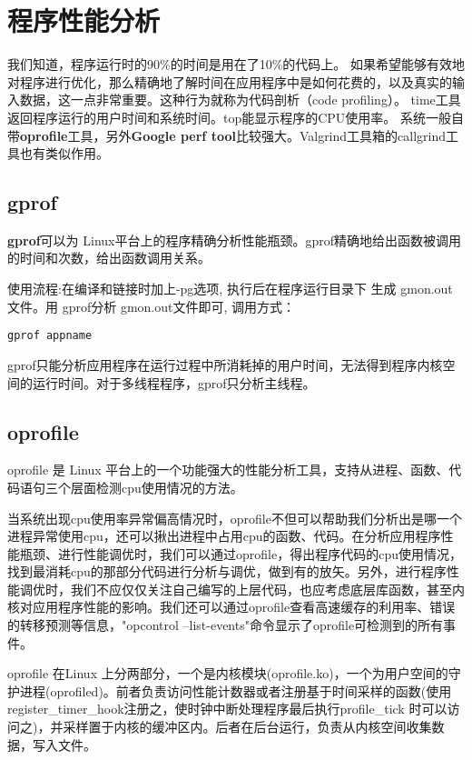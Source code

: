 \section{程序性能分析}
我们知道，程序运行时的90\%的时间是用在了10\%的代码上。
如果希望能够有效地对程序进行优化，那么精确地了解时间在应用程序中是如何花费的，以及真实的输入数据，这一点非常重要。这种行为就称为代码剖析（code profiling）。
time工具返回程序运行的用户时间和系统时间。top能显示程序的CPU使用率。
系统一般自带\textbf{oprofile}工具，另外\textbf{Google perf tool}比较强大。Valgrind工具箱的callgrind工具也有类似作用。



\subsection{gprof}
\textbf{gprof}可以为 Linux平台上的程序精确分析性能瓶颈。gprof精确地给出函数被调用的时间和次数，给出函数调用关系。

使用流程:在编译和链接时加上-pg选项, 执行后在程序运行目录下 生成 gmon.out 文件。用 gprof分析 gmon.out文件即可, 调用方式：
\begin{verbatim}
gprof appname
\end{verbatim}


gprof只能分析应用程序在运行过程中所消耗掉的用户时间，无法得到程序内核空间的运行时间。对于多线程程序，gprof只分析主线程。

\subsection{oprofile}

oprofile 是 Linux 平台上的一个功能强大的性能分析工具，支持从进程、函数、代码语句三个层面检测cpu使用情况的方法。

当系统出现cpu使用率异常偏高情况时，oprofile不但可以帮助我们分析出是哪一个进程异常使用cpu，还可以揪出进程中占用cpu的函数、代码。在分析应用程序性能瓶颈、进行性能调优时，我们可以通过oprofile，得出程序代码的cpu使用情况，找到最消耗cpu的那部分代码进行分析与调优，做到有的放矢。另外，进行程序性能调优时，我们不应仅仅关注自己编写的上层代码，也应考虑底层库函数，甚至内核对应用程序性能的影响。我们还可以通过oprofile查看高速缓存的利用率、错误的转移预测等信息，"opcontrol --list-events"命令显示了oprofile可检测到的所有事件。

oprofile 在Linux 上分两部分，一个是内核模块(oprofile.ko)，一个为用户空间的守护进程(oprofiled)。前者负责访问性能计数器或者注册基于时间采样的函数(使用register\_timer\_hook注册之，使时钟中断处理程序最后执行profile\_tick 时可以访问之)，并采样置于内核的缓冲区内。后者在后台运行，负责从内核空间收集数据，写入文件。

